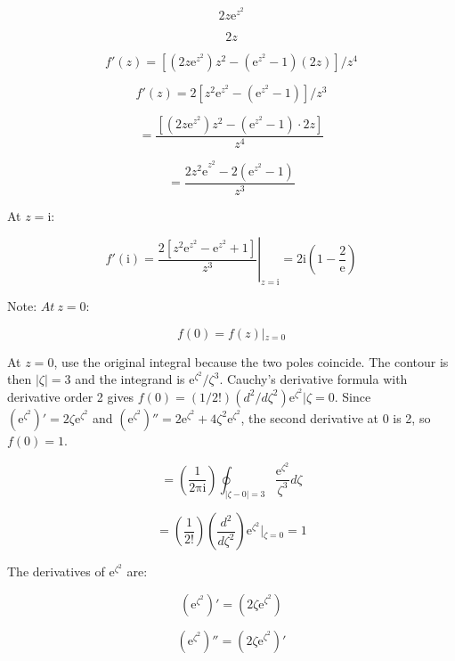 \documentclass[11pt,a4paper]{article}
\theoremstyle{definition}
\theoremstyle{plain}
\begin{document}
\[
2z\mathrm{e}^{z^{2}}
\]

\[
2z
\]

\[
f'(z) = [(2z\mathrm{e}^{z^{2}})z^{2} - (\mathrm{e}^{z^{2}} - 1)(2z)]/z^{4}
\]

\[
f'(z) = 2[z^{2}\mathrm{e}^{z^{2}} - (\mathrm{e}^{z^{2}} - 1)]/z^{3}
\]

\[
= \frac{{[(2z\mathrm{e}^{z^{2}})z^{2} - (\mathrm{e}^{z^{2}} - 1) \cdot 2z]}}{z^{4}}
\]

\[
= \frac{{{2z^{2}\mathrm{e}}^{z^{2}} - 2(\mathrm{e}^{z^{2}} - 1)}}{z^{3}}
\]

At $z = \mathrm{i}$:

\begin{equation}
f'(\mathrm{i}) = {\left.\frac{2[z^{2}\mathrm{e}^{z^{2}} - \mathrm{e}^{z^{2}} + 1]}{z^{3}}\right\vert{}}_{z = \mathrm{i}} = 2\mathrm{i}\left(1 - \frac{2}{\mathrm{e}}\right)
\end{equation}

Note: $At\ z = 0:$

\begin{equation}
f(0) = f(z)\vert{}_{z = 0}
\end{equation}

At $z = 0$, use the original integral because the two poles coincide. The contour is then $\vert{}\zeta\vert{} = 3$ and the integrand is $\mathrm{e}^{\zeta^{2}}/\zeta^{3}$. Cauchy's derivative formula with derivative order 2 gives $f(0) = (1/2!)(d^{2}/d\zeta^{2})\mathrm{e}^{\zeta^{2}}\vert{}\zeta = 0$. Since $(\mathrm{e}^{\zeta^{2}})'= 2\zeta \mathrm{e}^{\zeta^{2}}$ and $(\mathrm{e}^{\zeta^{2}})''= 2\mathrm{e}^{\zeta^{2}} + 4\zeta^{2}\mathrm{e}^{\zeta^{2}}$, the second derivative at 0 is 2, so $f(0) = 1$.

\begin{equation}
= \left(\frac{1}{2\mathrm{\pi}\mathrm{i}}\right)\oint_{\vert{}\zeta - 0\vert{} = 3}\frac{\mathrm{e}^{\zeta^{2}}}{\zeta^{3}}d\zeta
\end{equation}

\[
= \left(\frac{1}{2!}\right)\left(\frac{d^{2}}{d\zeta^{2}}\right)\mathrm{e}^{\zeta^{2}}\vert{}_{\zeta = 0} = 1
\]

The derivatives of $\mathrm{e}^{\zeta^{2}}$ are:

\begin{equation}
(\mathrm{e}^{\zeta^{2}})'= ({2\zeta \mathrm{e}}^{\zeta^{2}})
\end{equation}

\[
(\mathrm{e}^{\zeta^{2}})''= ({2\zeta \mathrm{e}}^{\zeta^{2}})'
\]
\end{document}
